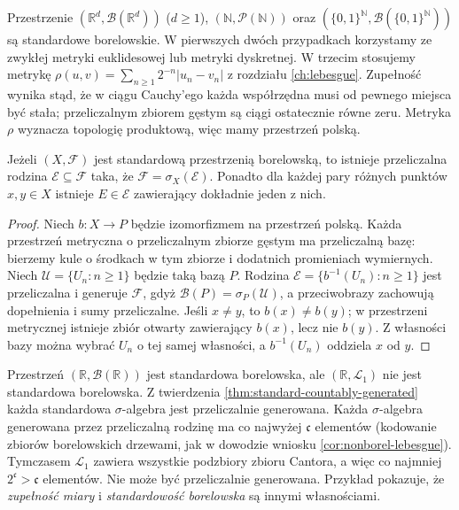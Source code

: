 \begin{przyklad}
Przestrzenie $(\mathbb R^d,\mathcal B(\mathbb R^d))$
($d\ge1$), $(\mathbb N,\mathcal P(\mathbb N))$ oraz
$(\{0,1\}^{\mathbb N},\mathcal B(\{0,1\}^{\mathbb N}))$
są standardowe borelowskie. W pierwszych dwóch przypadkach
korzystamy ze zwykłej metryki euklidesowej lub metryki
dyskretnej. W trzecim stosujemy metrykę
$\rho(u,v)=\sum_{n\ge1}2^{-n}|u_n-v_n|$ z rozdziału
\ref{ch:lebesgue}. Zupełność wynika stąd, że w ciągu
Cauchy'ego każda współrzędna musi od pewnego miejsca
być stała; przeliczalnym zbiorem gęstym są ciągi
ostatecznie równe zeru. Metryka $\rho$ wyznacza topologię
produktową, więc mamy przestrzeń polską.
\end{przyklad}

\begin{twierdzenie}
\label{thm:standard-countably-generated}
Jeżeli $(X,\mathcal F)$ jest standardową przestrzenią
borelowską, to istnieje przeliczalna rodzina
$\mathcal E\subseteq\mathcal F$ taka, że
$\mathcal F=\sigma_X(\mathcal E)$. Ponadto dla
każdej pary różnych punktów $x,y\in X$ istnieje
$E\in\mathcal E$ zawierający dokładnie jeden z nich.
\end{twierdzenie}
\begin{proof}
Niech $b:X\to P$ będzie izomorfizmem na przestrzeń polską.
Każda przestrzeń metryczna o przeliczalnym zbiorze gęstym
ma przeliczalną bazę: bierzemy kule o środkach w tym zbiorze
i dodatnich promieniach wymiernych. Niech
$\mathcal U=\{U_n:n\ge1\}$ będzie taką bazą $P$.
Rodzina $\mathcal E=\{b^{-1}(U_n):n\ge1\}$
jest przeliczalna i generuje $\mathcal F$, gdyż
$\mathcal B(P)=\sigma_P(\mathcal U)$, a przeciwobrazy
zachowują dopełnienia i sumy przeliczalne.
Jeśli $x\ne y$, to $b(x)\ne b(y)$; w przestrzeni
metrycznej istnieje zbiór otwarty zawierający $b(x)$,
lecz nie $b(y)$. Z własności bazy można wybrać
$U_n$ o tej samej własności, a $b^{-1}(U_n)$
oddziela $x$ od $y$.
\end{proof}

\begin{przyklad}
\label{ex:completion-not-standard}
Przestrzeń $(\mathbb R,\mathcal B(\mathbb R))$ jest
standardowa borelowska, ale
$(\mathbb R,\mathcal L_1)$ nie jest standardowa borelowska.
Z twierdzenia \ref{thm:standard-countably-generated}
każda standardowa $\sigma$-algebra jest przeliczalnie
generowana. Każda $\sigma$-algebra generowana przez
przeliczalną rodzinę ma co najwyżej $\mathfrak c$
elementów (kodowanie zbiorów borelowskich drzewami,
jak w dowodzie wniosku \ref{cor:nonborel-lebesgue}).
Tymczasem $\mathcal L_1$ zawiera wszystkie podzbiory
zbioru Cantora, a więc co najmniej $2^{\mathfrak c}>
\mathfrak c$ elementów. Nie może być przeliczalnie
generowana. Przykład pokazuje, że \emph{zupełność miary}
i \emph{standardowość borelowska} są innymi własnościami.
\end{przyklad}

